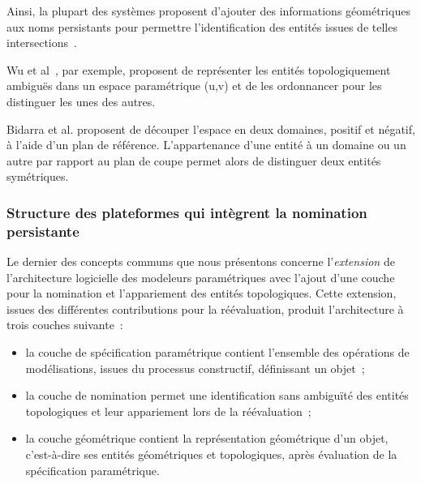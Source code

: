Ainsi, la plupart des systèmes proposent d'ajouter des informations géométriques
aux noms persistants pour permettre l'identification des entités issues de
telles intersections~\cite{wu2001face,bidarra2005feature,wang2005geometry}. %

Wu et al~\cite{wu2001face}, par exemple, proposent de représenter les entités
topologiquement ambiguës dans un espace paramétrique (u,v) et de les ordonnancer
pour les distinguer les unes des autres. %

Bidarra et al.\cite{bidarra2005feature} proposent de découper l'espace en deux domaines, positif et négatif, à l'aide d'un plan de référence. %
L'appartenance d'une entité à un domaine ou un autre par rapport au plan de
coupe permet alors de distinguer deux entités symétriques. %



\subsubsection*{Structure des plateformes qui intègrent la nomination persistante}


Le dernier des concepts communs que nous présentons concerne l'\textit{extension} de
l'architecture logicielle des modeleurs paramétriques avec l'ajout d'une couche
pour la nomination et l'appariement des entités topologiques. %
Cette extension, issues des différentes contributions pour la réévaluation,
produit l'architecture à trois couches suivante~:
\begin{itemize}
	\item la couche de spécification paramétrique contient l'ensemble des
	      opérations de modélisations, issues du processus constructif,
	      définissant un objet~; %
	\item la couche de nomination permet une identification sans ambiguïté des
	      entités topologiques et leur appariement lors de la réévaluation~; %
	\item la couche géométrique contient la représentation géométrique d'un
	      objet, c'est-à-dire ses entités géométriques et topologiques, après
	      évaluation de la spécification paramétrique. %
\end{itemize}


